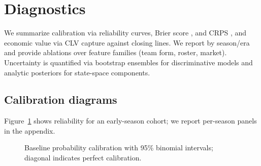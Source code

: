 

\section{Diagnostics}
We summarize calibration via reliability curves, Brier score \citep{brier1950}, and CRPS \citep{gneiting2007}, and economic value via CLV capture against closing lines. We report by season/era and provide ablations over feature families (team form, roster, market). Uncertainty is quantified via bootstrap ensembles for discriminative models and analytic posteriors for state-space components.

\subsection{Calibration diagrams}
Figure~\ref{fig:baseline-reliability} shows reliability for an early-season cohort; we report per-season panels in the appendix.
\begin{figure}[t]
  \centering
  \caption[Baseline calibration]{Baseline probability calibration with 95\% binomial intervals; diagonal indicates perfect calibration.}
  \label{fig:baseline-reliability}
\end{figure}

